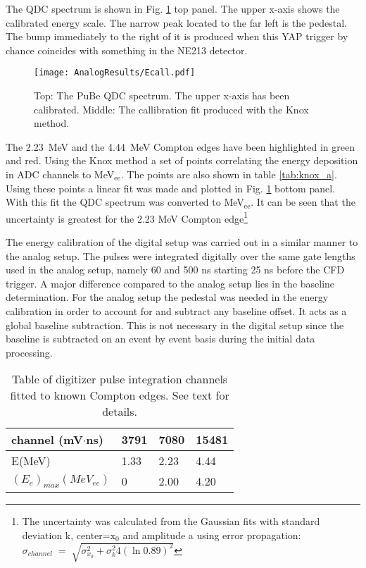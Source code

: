 \documentclass[main.tex]{subfiles}
\begin{document}
The QDC spectrum is shown in Fig. \ref{fig:qdc_a} top panel. The upper x-axis shows the calibrated energy scale. The narrow peak located to the far left is the pedestal. The bump immediately to the right of it is produced when this YAP trigger by chance coincides with something in the NE213 detector.
\begin{figure}[ht!]
    \centering
        \texttt{[image: AnalogResults/Ecall.pdf]}
        \caption[Energy calibration of the analog setup]{Top: The PuBe QDC spectrum. The upper x-axis has been calibrated. Middle: The callibration fit produced with the Knox method.}
    \label{fig:qdc_a}
\end{figure}

The \SI{2.23}{MeV} and the \SI{4.44}{MeV} Compton edges have been highlighted in green and red. Using the Knox method a set of points correlating the energy deposition in ADC channels to \si{\MeV}$_\text{ee}$. The points are also shown in table \ref{tab:knox_a}. Using these points a linear fit was made and plotted in Fig. \ref{fig:qdc_a} bottom panel. With this fit the QDC spectrum was converted to \si{\MeV}$_\text{ee}$. It can be seen that the uncertainty is greatest for the 2.23 \si{\MeV} Compton edge\footnote{The uncertainty was calculated from the Gaussian fits with standard deviation k, center=$\text{x}_\text{0}$ and amplitude a using error propagation: $\sigma_{channel}\;=\;\sqrt{\sigma_{x_0}^2 + \sigma_{k}^2 4\left(\ln0.89\right)^2 }$}

The energy calibration of the digital setup was carried out in a similar manner to the analog setup. The pulses were integrated digitally over the same gate lengths used in the analog setup, namely 60 and 500 ns starting 25 ns before the CFD trigger. A major difference compared to the analog setup lies in the baseline determination. For the analog setup the pedestal was needed in the energy calibration in order to account for and subtract any baseline offset. It acts as a global baseline subtraction. This is not necessary in the digital setup since the baseline is subtracted on an event by event basis during the initial data processing. 

\begin{table}[hb]
	\center
	\begin{tabular}{|l|l|l|l|}
	\hline
	channel (mV$\cdot$ns)            & 3791 & 7080  & 15481  \\
	\hline
	E(MeV)          & 1.33    & 2.23  & 4.44 \\
	\hline
	$(E_{e})_{max}(MeV_{ee})$ & 0    & 2.00  & 4.20 \\
	\hline
	\end{tabular}
   	\captionsetup{width=0.435\linewidth}
	\caption[Table of values used for energy calibration, digital setup.]{Table of digitizer pulse integration channels fitted to known Compton edges. See text for details.}
	\label{tab:knox_d}
\end{table}
\end{document}
